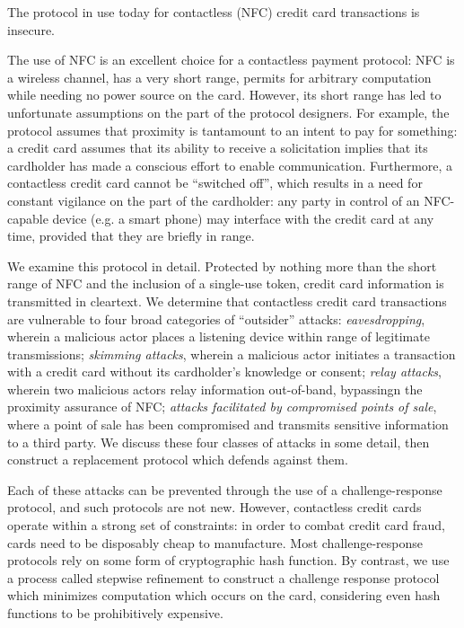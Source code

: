 The protocol in use today for contactless (NFC) credit card transactions is insecure.

The use of NFC is an excellent choice for a contactless payment protocol:
    NFC is a wireless channel, has a very short range, permits for arbitrary computation while needing no power source on the card.
However, its short range has led to unfortunate assumptions on the part of the protocol designers.
For example, the protocol assumes that proximity is tantamount to an intent to pay for something:
    a credit card assumes that its ability to receive a solicitation implies that its cardholder has made a conscious effort to enable communication.
Furthermore, a contactless credit card cannot be ``switched off'', which results in a need for constant vigilance on the part of the cardholder:
    any party in control of an NFC-capable device (e.g. a smart phone) may interface with the credit card at any time,
    provided that they are briefly in range.

We examine this protocol in detail.
Protected by nothing more than the short range of NFC and the inclusion of a single-use token, credit card information is transmitted in cleartext.
We determine that contactless credit card transactions are vulnerable to four broad categories of ``outsider'' attacks:
    \emph{eavesdropping}, wherein a malicious actor places a listening device within range of legitimate transmissions;
    \emph{skimming attacks}, wherein a malicious actor initiates a transaction with a credit card without its cardholder's knowledge or consent;
    \emph{relay attacks}, wherein two malicious actors relay information out-of-band, bypassingn the proximity assurance of NFC;
    \emph{attacks facilitated by compromised points of sale}, where a point of sale has been compromised and transmits sensitive information to a third party.
We discuss these four classes of attacks in some detail, then construct a replacement protocol which defends against them.

Each of these attacks can be prevented through the use of a challenge-response protocol, and such protocols are not new.
However, contactless credit cards operate within a strong set of constraints:
    in order to combat credit card fraud, cards need to be disposably cheap to manufacture.
Most challenge-response protocols rely on some form of cryptographic hash function.
By contrast, we use a process called stepwise refinement to construct a challenge response protocol which minimizes computation which occurs on the card,
    considering even hash functions to be prohibitively expensive.

